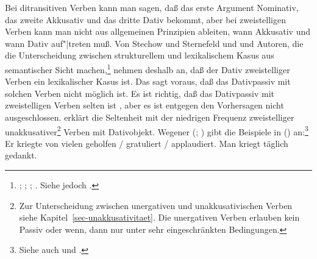 Bei ditransitiven Verben kann man sagen, daß das erste Argument Nominativ, das zweite
Akkusativ und das dritte Dativ bekommt, aber bei zweistelligen Verben kann man nicht aus allgemeinen
Prinzipien ableiten, wann Akkusativ und wann Dativ auf"|treten muß.
Von Stechow und Sternefeld \citeyearpar[]{SS88a} und
\citet[]{Stechow90a} und Autoren, die die Unterscheidung zwischen
strukturellem und lexikalischem Kasus aus semantischer Sicht machen,\footnote{
  \citealp[]{Kaufmann95a}; \citealp[--26]{Stiebels96a}; \citealp[]{Olsen97c};
  \citealp[, S.\,129]{Rapp97a}. Siehe jedoch .%
}
nehmen deshalb an,
daß der Dativ zweistelliger Verben ein lexikalischer Kasus ist.
Das sagt voraus, daß das Dativpassiv mit solchen Verben nicht möglich ist.
Es ist richtig, daß das Dativpassiv mit zweistelligen Verben selten ist \citep{HW95a},
aber es ist entgegen den Vorhersagen nicht ausgeschlossen.  \citet[]{Wegener90} erklärt die
Seltenheit mit der niedrigen Frequenz zweistelliger unakkusativer\footnote{ 
  Zur Unterscheidung zwischen unergativen und unakkusativischen Verben 
  siehe Kapitel~\ref{sec-unakkusativitaet}. Die unergativen Verben erlauben kein Passiv
  oder wenn, dann nur unter sehr eingeschränkten Bedingungen.%
}
Verben mit Dativobjekt.
Wegener (\citeyear[]{Wegener85a}; \citeyear[]{Wegener90}) 
gibt die Beispiele in () an:\footnote{
        Siehe auch  und .
}
\eal
\label{ex-er-kriegte-geholfen}
\ex{}
Er kriegte von vielen geholfen / gratuliert / applaudiert.
\ex{} 
Man kriegt täglich gedankt.
\zl

